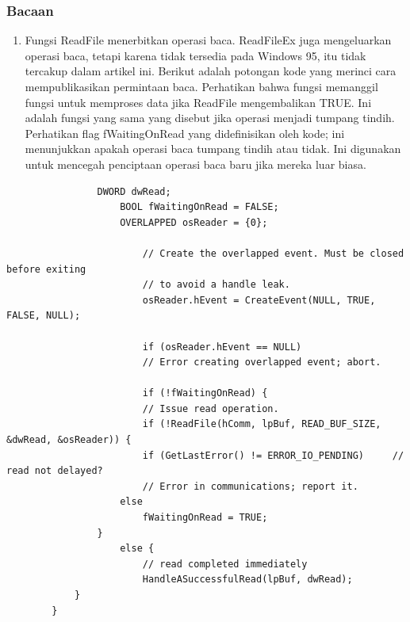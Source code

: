 				\subsubsection{Bacaan}
					\begin{enumerate}
						\item Fungsi ReadFile menerbitkan operasi baca. ReadFileEx juga mengeluarkan operasi baca, tetapi karena tidak tersedia pada Windows 95, itu tidak tercakup dalam artikel ini. Berikut adalah potongan kode yang merinci cara mempublikasikan permintaan baca. Perhatikan bahwa fungsi memanggil fungsi untuk memproses data jika ReadFile mengembalikan TRUE. Ini adalah fungsi yang sama yang disebut jika operasi menjadi tumpang tindih. Perhatikan flag fWaitingOnRead yang didefinisikan oleh kode; ini menunjukkan apakah operasi baca tumpang tindih atau tidak. Ini digunakan untuk mencegah penciptaan operasi baca baru jika mereka luar biasa.
					\end{enumerate}
				
				\begin{verbatim}
				DWORD dwRead;
					BOOL fWaitingOnRead = FALSE;
					OVERLAPPED osReader = {0};

						// Create the overlapped event. Must be closed before exiting
						// to avoid a handle leak.
						osReader.hEvent = CreateEvent(NULL, TRUE, FALSE, NULL);

						if (osReader.hEvent == NULL)
						// Error creating overlapped event; abort.

						if (!fWaitingOnRead) {
						// Issue read operation.
						if (!ReadFile(hComm, lpBuf, READ_BUF_SIZE, &dwRead, &osReader)) {
						if (GetLastError() != ERROR_IO_PENDING)     // read not delayed?
						// Error in communications; report it.
					else
						fWaitingOnRead = TRUE;
				}
					else {    
						// read completed immediately
						HandleASuccessfulRead(lpBuf, dwRead);
			}
		}
				\end{verbatim}

